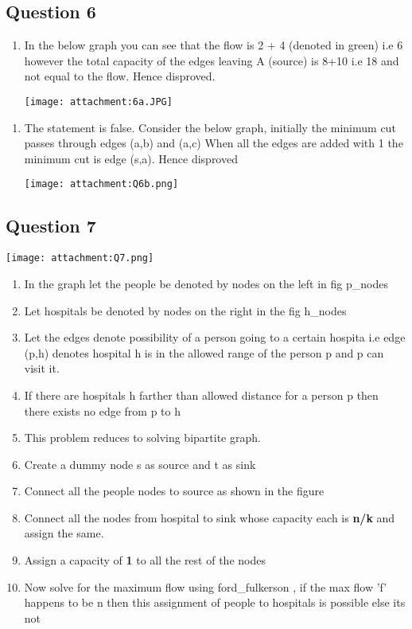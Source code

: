 \documentclass[11pt]{article}
\makeatletter
\def\maxwidth{\ifdim\Gin@nat@width>\linewidth\linewidth
    \else\Gin@nat@width\fi}
\let\Oldincludegraphics\includegraphics
\renewcommand{\includegraphics}[1]{\Oldincludegraphics[width=.8\maxwidth]{#1}}
\providecommand{\tightlist}{%
      \setlength{\itemsep}{0pt}\setlength{\parskip}{0pt}}
\makeatother
\begin{document}
    \subsection{Question 6}\label{question-6}

    \begin{enumerate}
\def\labelenumi{\alph{enumi}.}
\tightlist
\item
  In the below graph you can see that the flow is 2 + 4 (denoted in
  green) i.e 6 however the total capacity of the edges leaving A
  (source) is 8+10 i.e 18 and not equal to the flow. Hence disproved.

  \texttt{[image: attachment:6a.JPG]}
\end{enumerate}

    \begin{enumerate}
\def\labelenumi{\alph{enumi}.}
\setcounter{enumi}{1}
\tightlist
\item
  The statement is false. Consider the below graph, initially the
  minimum cut passes through edges (a,b) and (a,c) When all the edges
  are added with 1 the minimum cut is edge (s,a). Hence disproved

  \texttt{[image: attachment:Q6b.png]}
\end{enumerate}

    \subsection{Question 7}\label{question-7}

\texttt{[image: attachment:Q7.png]}

\begin{enumerate}
\def\labelenumi{\arabic{enumi}.}
\item
  In the graph let the people be denoted by nodes on the left in fig
  p\_nodes
\item
  Let hospitals be denoted by nodes on the right in the fig h\_nodes
\item
  Let the edges denote possibility of a person going to a certain
  hospita i.e edge (p,h) denotes hospital h is in the allowed range of
  the person p and p can visit it.
\item
  If there are hospitals h farther than allowed distance for a person p
  then there exists no edge from p to h
\item
  This problem reduces to solving bipartite graph.
\item
  Create a dummy node s as source and t as sink
\item
  Connect all the people nodes to source as shown in the figure
\item
  Connect all the nodes from hospital to sink whose capacity each is
  \textbf{n/k} and assign the same.
\item
  Assign a capacity of \textbf{1} to all the rest of the nodes
\item
  Now solve for the maximum flow using ford\_fulkerson , if the max flow
  'f' happens to be n then this assignment of people to hospitals is
  possible else its not
\end{enumerate}
\end{document}
